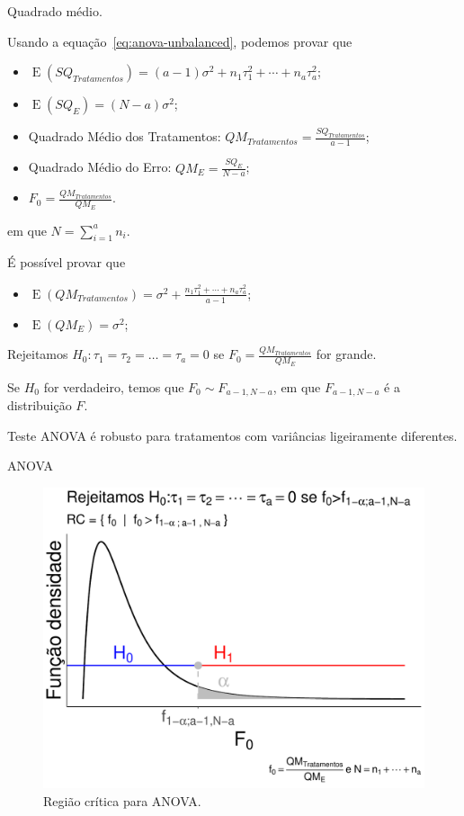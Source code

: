 \documentclass[8pt]{beamer}
\DeclareMathOperator{\espe}{E}
\begin{document}
\begin{frame}{Quadrado médio.}

Usando a equação~\eqref{eq:anova-unbalanced}, podemos provar que 
\begin{itemize}
	\item $\espe\left(SQ_{Tratamentos}\right) = (a-1) \sigma^2 +  n_1 \tau_1^2 + \cdots + n_a \tau_a^2 $;
	\item $\espe\left( SQ_E \right) = (N - a ) \sigma^2$;
	\item Quadrado Médio dos Tratamentos: $QM_{Tratamentos} = \frac{SQ_{Tratamentos}}{a-1}$;
	\item Quadrado Médio do Erro: $QM_E = \frac{SQ_{E}}{N-a}$;
	\item $F_0 = \frac{QM_{Tratamentos}}{QM_E}$.
\end{itemize}
em que $N = \sum_{i=1}^a n_i$.
\vfill

É possível provar que 
\begin{itemize}
	\item $\espe\left(QM_{Tratamentos}\right) = \sigma^2 + \frac{n_1 \tau_1^2 + \cdots + n_a \tau_a^2}{a-1}$;
	\item $\espe \left( QM_{E} \right)= \sigma^2$;
\end{itemize}

Rejeitamos $H_0: \tau_1 = \tau_2 = \dots = \tau_a = 0$ se $F_0 = \frac{QM_{Tratamentos}}{QM_E}$ for grande.

Se $H_0$ for verdadeiro, temos que $F_0 \sim F_{a-1, N-a}$, em que $F_{a-1, N-a}$ é a distribuição $F$.

Teste ANOVA é robusto para tratamentos com variâncias ligeiramente diferentes.

\end{frame}

\begin{frame}{ANOVA}
\begin{figure}[htbp]
	\centering
	\includegraphics[width=0.70\linewidth]{figure/anova-test-unbalanced.pdf}
	\caption{Região crítica para ANOVA.}
\end{figure}
\end{frame}
\end{document}
